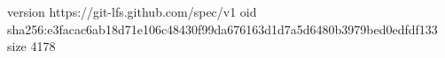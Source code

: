 version https://git-lfs.github.com/spec/v1
oid sha256:e3facac6ab18d71e106c48430f99da676163d1d7a5d6480b3979bed0edfdf133
size 4178
